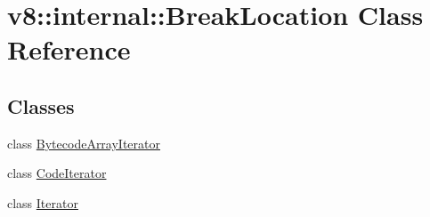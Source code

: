 \hypertarget{classv8_1_1internal_1_1_break_location}{}\section{v8\+:\+:internal\+:\+:Break\+Location Class Reference}
\label{classv8_1_1internal_1_1_break_location}
\subsection*{Classes}
\begin{DoxyCompactItemize}
\item 
class \hyperlink{classv8_1_1internal_1_1_break_location_1_1_bytecode_array_iterator}{Bytecode\+Array\+Iterator}
\item 
class \hyperlink{classv8_1_1internal_1_1_break_location_1_1_code_iterator}{Code\+Iterator}
\item 
class \hyperlink{classv8_1_1internal_1_1_break_location_1_1_iterator}{Iterator}
\end{DoxyCompactItemize}
